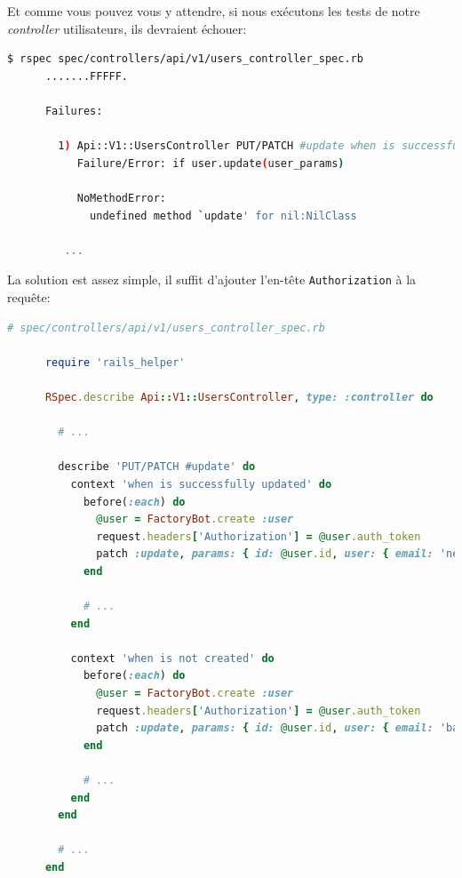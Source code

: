 \documentclass[]{report}
\begin{document}
    Et comme vous pouvez vous y attendre, si nous exécutons les tests de notre \textit{controller} utilisateurs, ils devraient échouer:

    \begin{scriptsize}
      \begin{lstlisting}[language=bash]
      $ rspec spec/controllers/api/v1/users_controller_spec.rb
      .......FFFFF.

      Failures:

        1) Api::V1::UsersController PUT/PATCH #update when is successfully updated renders the json representation for the updated user
           Failure/Error: if user.update(user_params)

           NoMethodError:
             undefined method `update' for nil:NilClass

         ...
      \end{lstlisting}
    \end{scriptsize}

    La solution est assez simple, il suffit d'ajouter l'en-tête \verb|Authorization| à la requête:

    \begin{scriptsize}
      \begin{lstlisting}[language=ruby]
      # spec/controllers/api/v1/users_controller_spec.rb

      require 'rails_helper'

      RSpec.describe Api::V1::UsersController, type: :controller do

        # ...

        describe 'PUT/PATCH #update' do
          context 'when is successfully updated' do
            before(:each) do
              @user = FactoryBot.create :user
              request.headers['Authorization'] = @user.auth_token
              patch :update, params: { id: @user.id, user: { email: 'newmail@example.com' } }, format: :json
            end

            # ...
          end

          context 'when is not created' do
            before(:each) do
              @user = FactoryBot.create :user
              request.headers['Authorization'] = @user.auth_token
              patch :update, params: { id: @user.id, user: { email: 'bademail.com' } }, format: :json
            end

            # ...
          end
        end

        # ...
      end
      \end{lstlisting}
    \end{scriptsize}
\end{document}
